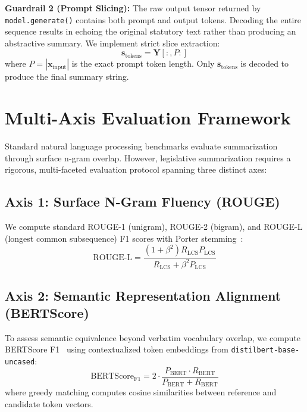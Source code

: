 \documentclass[conference]{IEEEtran}
\begin{document}
\textbf{Guardrail 2 (Prompt Slicing):} The raw output tensor returned by \texttt{model.generate()} contains both prompt and output tokens. Decoding the entire sequence results in echoing the original statutory text rather than producing an abstractive summary. We implement strict slice extraction:
\begin{equation}
\mathbf{s}_{\text{tokens}} = \mathbf{Y}[:, P:]
\label{eq:prompt_slicing}
\end{equation}
where $P = |\mathbf{x}_{\text{input}}|$ is the exact prompt token length. Only $\mathbf{s}_{\text{tokens}}$ is decoded to produce the final summary string.

\section{Multi-Axis Evaluation Framework}
\label{sec:eval_framework}
Standard natural language processing benchmarks evaluate summarization through surface n-gram overlap. However, legislative summarization requires a rigorous, multi-faceted evaluation protocol spanning three distinct axes:

\subsection{Axis 1: Surface N-Gram Fluency (ROUGE)}
We compute standard ROUGE-1 (unigram), ROUGE-2 (bigram), and ROUGE-L (longest common subsequence) F1 scores with Porter stemming~\cite{lin2004rouge}:
\begin{equation}
\text{ROUGE-L} = \frac{(1 + \beta^2) R_{\text{LCS}} P_{\text{LCS}}}{R_{\text{LCS}} + \beta^2 P_{\text{LCS}}}
\label{eq:rouge_l}
\end{equation}

\subsection{Axis 2: Semantic Representation Alignment (BERTScore)}
To assess semantic equivalence beyond verbatim vocabulary overlap, we compute BERTScore F1~\cite{zhang2019bertscore} using contextualized token embeddings from \texttt{distilbert-base-uncased}:
\begin{equation}
\text{BERTScore}_{\text{F1}} = 2 \cdot \frac{P_{\text{BERT}} \cdot R_{\text{BERT}}}{P_{\text{BERT}} + R_{\text{BERT}}}
\label{eq:bertscore}
\end{equation}
where greedy matching computes cosine similarities between reference and candidate token vectors.
\end{document}
